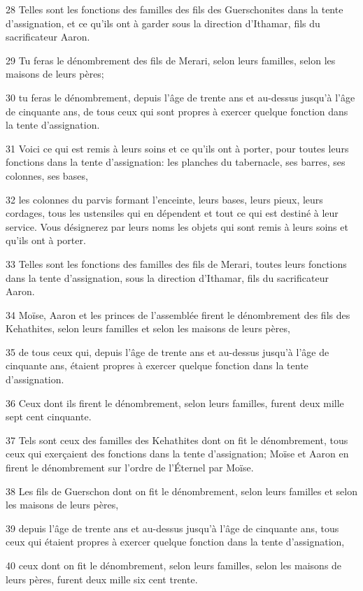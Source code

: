 \par 28 Telles sont les fonctions des familles des fils des Guerschonites dans la tente d'assignation, et ce qu'ils ont à garder sous la direction d'Ithamar, fils du sacrificateur Aaron.
\par 29 Tu feras le dénombrement des fils de Merari, selon leurs familles, selon les maisons de leurs pères;
\par 30 tu feras le dénombrement, depuis l'âge de trente ans et au-dessus jusqu'à l'âge de cinquante ans, de tous ceux qui sont propres à exercer quelque fonction dans la tente d'assignation.
\par 31 Voici ce qui est remis à leurs soins et ce qu'ils ont à porter, pour toutes leurs fonctions dans la tente d'assignation: les planches du tabernacle, ses barres, ses colonnes, ses bases,
\par 32 les colonnes du parvis formant l'enceinte, leurs bases, leurs pieux, leurs cordages, tous les ustensiles qui en dépendent et tout ce qui est destiné à leur service. Vous désignerez par leurs noms les objets qui sont remis à leurs soins et qu'ils ont à porter.
\par 33 Telles sont les fonctions des familles des fils de Merari, toutes leurs fonctions dans la tente d'assignation, sous la direction d'Ithamar, fils du sacrificateur Aaron.
\par 34 Moïse, Aaron et les princes de l'assemblée firent le dénombrement des fils des Kehathites, selon leurs familles et selon les maisons de leurs pères,
\par 35 de tous ceux qui, depuis l'âge de trente ans et au-dessus jusqu'à l'âge de cinquante ans, étaient propres à exercer quelque fonction dans la tente d'assignation.
\par 36 Ceux dont ils firent le dénombrement, selon leurs familles, furent deux mille sept cent cinquante.
\par 37 Tels sont ceux des familles des Kehathites dont on fit le dénombrement, tous ceux qui exerçaient des fonctions dans la tente d'assignation; Moïse et Aaron en firent le dénombrement sur l'ordre de l'Éternel par Moïse.
\par 38 Les fils de Guerschon dont on fit le dénombrement, selon leurs familles et selon les maisons de leurs pères,
\par 39 depuis l'âge de trente ans et au-dessus jusqu'à l'âge de cinquante ans, tous ceux qui étaient propres à exercer quelque fonction dans la tente d'assignation,
\par 40 ceux dont on fit le dénombrement, selon leurs familles, selon les maisons de leurs pères, furent deux mille six cent trente.
